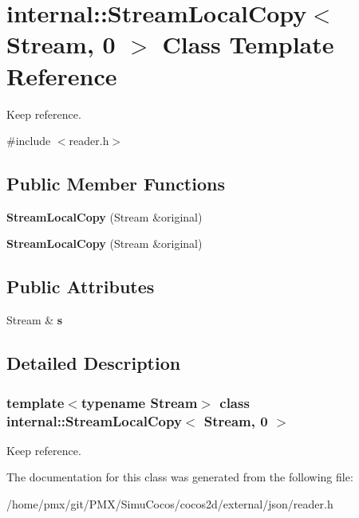 \hypertarget{classinternal_1_1StreamLocalCopy_3_01Stream_00_010_01_4}{}\section{internal\+:\+:Stream\+Local\+Copy$<$ Stream, 0 $>$ Class Template Reference}
\label{classinternal_1_1StreamLocalCopy_3_01Stream_00_010_01_4}


Keep reference.  




{\ttfamily \#include $<$reader.\+h$>$}

\subsection*{Public Member Functions}
\begin{DoxyCompactItemize}
\item 
\mbox{\label{classinternal_1_1StreamLocalCopy_3_01Stream_00_010_01_4_ac684a7be07d79d6ddd274dc1150f4b79}} 
{\bfseries Stream\+Local\+Copy} (Stream \&original)
\item 
\mbox{\label{classinternal_1_1StreamLocalCopy_3_01Stream_00_010_01_4_ac684a7be07d79d6ddd274dc1150f4b79}} 
{\bfseries Stream\+Local\+Copy} (Stream \&original)
\end{DoxyCompactItemize}
\subsection*{Public Attributes}
\begin{DoxyCompactItemize}
\item 
\mbox{\label{classinternal_1_1StreamLocalCopy_3_01Stream_00_010_01_4_af0474c97cc24e685f1953988086ac71a}} 
Stream \& {\bfseries s}
\end{DoxyCompactItemize}


\subsection{Detailed Description}
\subsubsection*{template$<$typename Stream$>$\newline
class internal\+::\+Stream\+Local\+Copy$<$ Stream, 0 $>$}

Keep reference. 

The documentation for this class was generated from the following file\+:\begin{DoxyCompactItemize}
\item 
/home/pmx/git/\+P\+M\+X/\+Simu\+Cocos/cocos2d/external/json/reader.\+h\end{DoxyCompactItemize}
